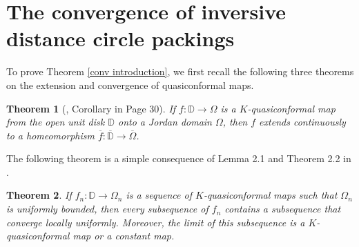 \documentclass[12pt]{amsart}
\newtheorem{theorem}{Theorem}[section]
\def\T{\mathcal{T}}
\def\D{\mathbb{D}}
\begin{document}
\section{The convergence of inversive distance circle packings}\label{section 4}




To prove Theorem \ref{conv introduction}, we first recall the following three theorems on the extension and convergence of quasiconformal maps.
\begin{theorem}[\cite{Al}, Corollary in Page 30]
\label{extension}
If $f: \D \to \Omega$ is a $K$-quasiconformal map from the open unit disk $\mathbb{D}$ onto a Jordan
domain $\Omega$, then $f$ extends continuously to a
homeomorphism $\overline{f}: \overline{\D} \to
\overline{\Omega}$.
\end{theorem}
The following theorem is a simple consequence of Lemma 2.1 and Theorem 2.2 in \cite{Leh}.
\begin{theorem}
\label{compactness}
If $f_n:\mathbb{D}\to\Omega_n$ is a sequence of $K$-quasiconformal maps such that $\Omega_n$ is uniformly bounded, then every subsequence of $f_n$ contains a subsequence that converge locally uniformly. Moreover, the limit of this subsequence is a $K$-quasiconformal map or a constant map.
\end{theorem}
\end{document}
